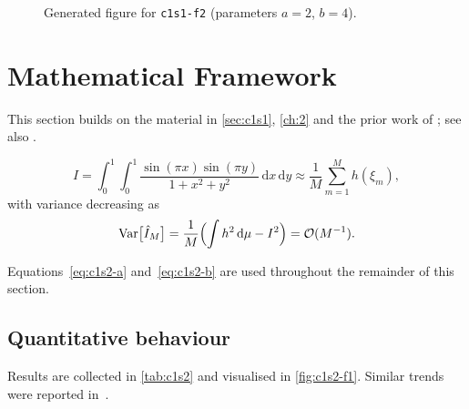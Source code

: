 \begin{figure}[htbp]
\centering
{}
\caption{Generated figure for \texttt{c1s1-f2} (parameters $a=2$, $b=4$).}\label{fig:c1s1-f2}
\end{figure}

\kant[9-11]

\section{Mathematical Framework}\label{sec:c1s2}
\lipsum[9-9]

This section builds on the material in \cref{sec:c1s1}, \cref{ch:2} and the prior work of \citet{ch1-9}; see also \citep{ch1-11,ch1-4}.

\begin{equation}\label{eq:c1s2-a}
  I = \int_{0}^{1}\!\!\int_{0}^{1} \frac{\sin(\pi x)\sin(\pi y)}{1+x^2+y^2}\,\mathrm{d}x\,\mathrm{d}y \approx \frac{1}{M}\sum_{m=1}^{M} h(\xi_m),
\end{equation}
with variance decreasing as
\begin{equation}\label{eq:c1s2-b}
  \operatorname{Var}\bigl[\hat I_M\bigr] = \frac{1}{M}\Bigl(\int h^2\,\mathrm{d}\mu - I^2\Bigr) = \mathcal{O}(M^{-1}).
\end{equation}

Equations~\eqref{eq:c1s2-a} and~\eqref{eq:c1s2-b} are used throughout the remainder of this section.

\lipsum[104-105]

\subsection{Quantitative behaviour}\label{sec:c1s2-q}
Results are collected in \cref{tab:c1s2} and visualised in \cref{fig:c1s2-f1}. Similar trends were reported in~\citep{ch1-5,ch1-13}.

